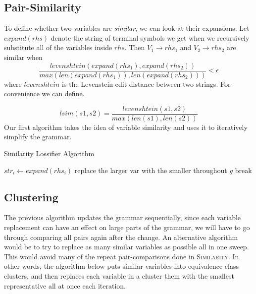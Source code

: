 \documentclass[11pt]{article}
\newcommand{\Similarity}{\textsc{Similarity}\xspace}
\begin{document}
\subsection{Pair-Similarity}

To define whether two variables are \emph{similar}, we can look at their
expansions. Let $expand(rhs)$ denote the string of terminal symbols we get when
we recursively substitute all of the variables inside $rhs$. Then $V_1
\rightarrow rhs_1$ and $V_2 \rightarrow rhs_2$ are similar when
\[
  \frac{levenshtein(expand(rhs_1),expand(rhs_2))}
      {max(len(expand(rhs_1)),len(expand(rhs_2)))} < \epsilon
\]
where $levenshtein$ is the Levenstein edit distance between two strings.  For
convenience we can define.

\[ lsim(s1,s2) = \frac{levenshtein(s1,s2)}{max(len(s1),len(s2))} \]
Our first algorithm takes the idea of variable similarity and uses it to
iteratively simplify the grammar.

\begin{algorithm}[h]
\caption{Similarity Lossifier Algorithm}
\label{sim_alg}
\begin{algorithmic}[1]
 
      \State $str_{i} \gets expand(rhs_i)$
        \State replace the larger var with the smaller throughout $g$
        \State break
      \EndIf
    \EndFor
  \EndWhile
\EndProcedure
\end{algorithmic}
\end{algorithm}

\subsection{Clustering}

The previous algorithm updates the grammar sequentially, since each variable
replacement can have an effect on large parts of the grammar, we will have to
go through comparing all pairs again after the change.  An alternative
algorithm would be to try to replace as many similar variables as possible
all in one sweep. This would
avoid many of the repeat pair-comparisons done in \Similarity. In other
words, the algorithm below puts similar variables into equivalence class
clusters, and then replaces each variable in a cluster them with the smallest
representative all at once each iteration.
\end{document}
